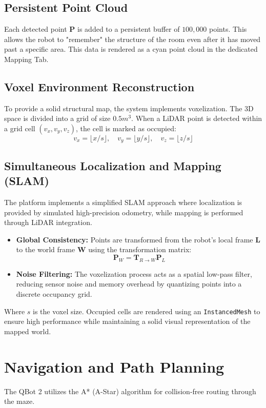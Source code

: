 \documentclass[12pt, a4paper]{article}
\begin{document}
\subsection{Persistent Point Cloud}
Each detected point $\mathbf{P}$ is added to a persistent buffer of $100,000$ points. This allows the robot to "remember" the structure of the room even after it has moved past a specific area. This data is rendered as a cyan point cloud in the dedicated Mapping Tab.

\subsection{Voxel Environment Reconstruction}
To provide a solid structural map, the system implements voxelization. The 3D space is divided into a grid of size $0.5m^3$. When a LiDAR point is detected within a grid cell $(v_x, v_y, v_z)$, the cell is marked as occupied:
\begin{equation}
    v_x = \lfloor x / s \rfloor, \quad v_y = \lfloor y / s \rfloor, \quad v_z = \lfloor z / s \rfloor
\end{equation}
\subsection{Simultaneous Localization and Mapping (SLAM)}
The platform implements a simplified SLAM approach where localization is provided by simulated high-precision odometry, while mapping is performed through LiDAR integration.
\begin{itemize}
    \item \textbf{Global Consistency:} Points are transformed from the robot's local frame $\mathbf{L}$ to the world frame $\mathbf{W}$ using the transformation matrix:
    \begin{equation}
        \mathbf{P}_W = \mathbf{T}_{R \to W} \mathbf{P}_L
    \end{equation}
    \item \textbf{Noise Filtering:} The voxelization process acts as a spatial low-pass filter, reducing sensor noise and memory overhead by quantizing points into a discrete occupancy grid.
\end{itemize}

Where $s$ is the voxel size. Occupied cells are rendered using an \texttt{InstancedMesh} to ensure high performance while maintaining a solid visual representation of the mapped world.

\section{Navigation and Path Planning}
The QBot 2 utilizes the A* (A-Star) algorithm for collision-free routing through the maze.
\end{document}
